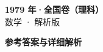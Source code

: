 \documentclass[zihao=-4, a4paper]{ctexart}
\begin{document}
\begin{center}
  {\Large\bfseries 1979 年·全国卷（理科）}\\[4pt]
  {\large 数学 · 解析版}
\end{center}
\medskip
{}

\clearpage
{}
\begin{center}{\Large\bfseries 参考答案与详细解析}\end{center}
\medskip

\end{document}
